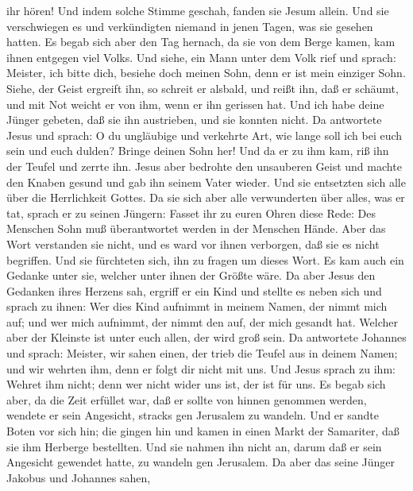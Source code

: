 ihr hören!  Und indem solche Stimme geschah, fanden sie
Jesum allein. Und sie verschwiegen es und verkündigten niemand in jenen
Tagen, was sie gesehen hatten.  Es begab sich aber den Tag
hernach, da sie von dem Berge kamen, kam ihnen entgegen viel Volks.
 Und siehe, ein Mann unter dem Volk rief und sprach:
Meister, ich bitte dich, besiehe doch meinen Sohn, denn er ist mein
einziger Sohn.  Siehe, der Geist ergreift ihn, so schreit
er alsbald, und reißt ihn, daß er schäumt, und mit Not weicht er von
ihm, wenn er ihn gerissen hat.  Und ich habe deine Jünger
gebeten, daß sie ihn austrieben, und sie konnten nicht.  Da
antwortete Jesus und sprach: O du ungläubige und verkehrte Art, wie
lange soll ich bei euch sein und euch dulden? Bringe deinen Sohn her!
 Und da er zu ihm kam, riß ihn der Teufel und zerrte ihn.
Jesus aber bedrohte den unsauberen Geist und machte den Knaben gesund
und gab ihn seinem Vater wieder.  Und sie entsetzten sich
alle über die Herrlichkeit Gottes. Da sie sich aber alle verwunderten
über alles, was er tat, sprach er zu seinen Jüngern: 
Fasset ihr zu euren Ohren diese Rede: Des Menschen Sohn muß
überantwortet werden in der Menschen Hände.  Aber das Wort
verstanden sie nicht, und es ward vor ihnen verborgen, daß sie es nicht
begriffen. Und sie fürchteten sich, ihn zu fragen um dieses Wort.
 Es kam auch ein Gedanke unter sie, welcher unter ihnen der
Größte wäre.  Da aber Jesus den Gedanken ihres Herzens sah,
ergriff er ein Kind und stellte es neben sich  und sprach
zu ihnen: Wer dies Kind aufnimmt in meinem Namen, der nimmt mich auf;
und wer mich aufnimmt, der nimmt den auf, der mich gesandt hat. Welcher
aber der Kleinste ist unter euch allen, der wird groß sein.
 Da antwortete Johannes und sprach: Meister, wir sahen
einen, der trieb die Teufel aus in deinem Namen; und wir wehrten ihm,
denn er folgt dir nicht mit uns.  Und Jesus sprach zu ihm:
Wehret ihm nicht; denn wer nicht wider uns ist, der ist für uns.
 Es begab sich aber, da die Zeit erfüllet war, daß er
sollte von hinnen genommen werden, wendete er sein Angesicht, stracks
gen Jerusalem zu wandeln.  Und er sandte Boten vor sich
hin; die gingen hin und kamen in einen Markt der Samariter, daß sie ihm
Herberge bestellten.  Und sie nahmen ihn nicht an, darum
daß er sein Angesicht gewendet hatte, zu wandeln gen Jerusalem.
 Da aber das seine Jünger Jakobus und Johannes sahen,
